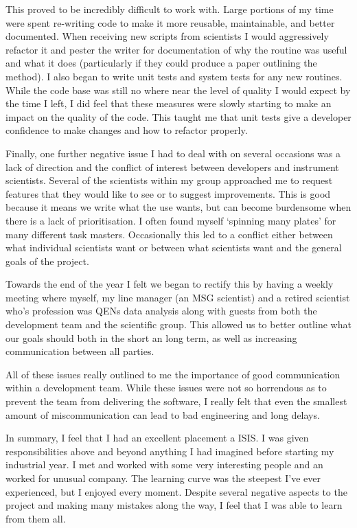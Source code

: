 \documentclass[paper=a4, fontsize=11pt]{scrartcl}	%
\numberwithin{equation}{section}															%
\numberwithin{figure}{section}																%
\numberwithin{table}{section}
\begin{document}
This proved to be incredibly difficult to work with. Large portions of
my time were spent re-writing code to make it more reusable,
maintainable, and better documented. When receiving new scripts from
scientists I would aggressively refactor it and pester the writer for
documentation of why the routine was useful and what it does
(particularly if they could produce a paper outlining the method). I
also began to write unit tests and system tests for any new routines.
While the code base was still no where near the level of quality I would
expect by the time I left, I did feel that these measures were slowly
starting to make an impact on the quality of the code. This taught me that unit tests give a developer confidence to make changes and how to refactor properly.

Finally, one further negative issue I had to deal with on several
occasions was a lack of direction and the conflict of interest between
developers and instrument scientists. Several of the scientists within
my group approached me to request features that they would like to see
or to suggest improvements. This is good because it means we write what
the use wants, but can become burdensome when there is a lack of
prioritisation. I often found myself `spinning many plates' for many
different task masters. Occasionally this led to a conflict either
between what individual scientists want or between what scientists want
and the general goals of the project.

Towards the end of the year I felt we began to rectify this by having a
weekly meeting where myself, my line manager (an MSG scientist) and a
retired scientist who's profession was QENs data analysis along with
guests from both the development team and the scientific group. This
allowed us to better outline what our goals should both in the short an
long term, as well as increasing communication between all parties.

All of these issues really outlined to me the importance of good communication within a development team. While these issues were not so horrendous as to prevent the team from delivering the software, I really felt that even the smallest amount of miscommunication can lead to bad engineering and long delays.

In summary, I feel that I had an excellent placement a ISIS. I was given
responsibilities above and beyond anything I had imagined before
starting my industrial year. I met and worked with some very interesting
people and an worked for unusual company. The learning curve was the
steepest I've ever experienced, but I enjoyed every moment. Despite
several negative aspects to the project and making many mistakes along
the way, I feel that I was able to learn from them all.
\end{document}
